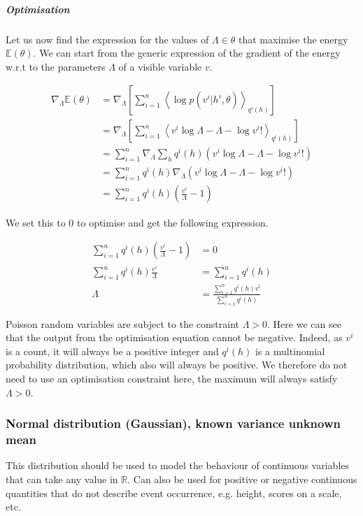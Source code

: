 \documentclass[]{article}
\newcommand{\R}{\mathbb{R}}
\begin{document}
\subparagraph{Optimisation}

Let us now find the expression for the values of $\Lambda \in \theta$ that maximise the energy $\mathbb{E}(\theta)$. We can start from the generic expression of the gradient of the energy w.r.t to the parameters $\Lambda$ of a visible variable $v$.

\begin{align*}
	\nabla_{\Lambda} \mathbb{E}(\theta) &= \nabla_{\Lambda}\left[ \sum_{i=1}^{n}  \left\langle \log p(v^i|h^i, \theta) \right\rangle_{q^i(h)} \right] \\
	&= \nabla_{\Lambda} \left[ \sum_{i=1}^{n}  \left\langle v^i \log \Lambda - \Lambda - \log v^i! \right\rangle_{q^i(h)} \right] \\
	&= \sum_{i=1}^{n} \nabla_{\Lambda} \sum_{h} q^i(h) (v^i \log \Lambda - \Lambda - \log v^i!) \\
	&= \sum_{i=1}^{n} q^i(h) \nabla_{\Lambda} (v^i \log \Lambda - \Lambda - \log v^i!) \\
	&= \sum_{i=1}^{n} q^i(h) \left(\frac{v^i}{\Lambda} - 1 \right)
\end{align*}

We set this to 0 to optimise and get the following expression.

\begin{align*}
	\sum_{i=1}^{n} q^i(h) \left( \frac{v^i}{\Lambda} - 1 \right) &= 0 \\
	\sum_{i=1}^{n} q^i(h) \frac{v^i}{\Lambda} &= \sum_{i=1}^{n} q^i(h) \\
	\Lambda &= \frac{\sum_{i=1}^{n} q^i(h)v^i}{\sum_{i=1}^{n} q^i(h) }
\end{align*}

Poisson random variables are subject to the constraint $\Lambda > 0$. Here we can see that the output from the optimisation equation cannot be negative. Indeed, as $v^i$ is a count, it will always be a positive integer and $q^i(h)$ is a multinomial probability distribution, which also will always be positive. We therefore do not need to use an optimisation constraint here, the maximum will always satisfy $\Lambda > 0$.


\subsubsection{Normal distribution (Gaussian), known variance unknown mean}

This distribution should be used to model the behaviour of continuous variables that can take any value in $\R$. Can also be used for positive or negative continuous quantities that do not describe event occurrence, e.g. height, scores on a scale, etc.
\end{document}

